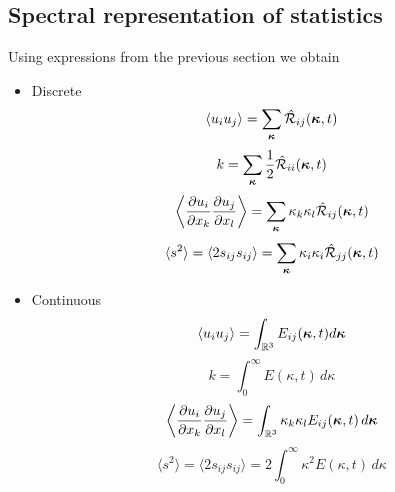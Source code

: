 \documentclass[oneside,a4paper,11pt]{report}
\newcommand{\tpvc}{\mathcal{R}} %
\newcommand{\est}{E}            %
\newcommand{\uifluc}{u_i}
\newcommand{\ujfluc}{u_j}
\begin{document}
\subsection{Spectral representation of statistics}
Using expressions from the previous section we obtain
\begin{itemize}
\item Discrete
\begin{equation}
    \langle \uifluc \ujfluc \rangle = \sum_{\kvec} \hat{\tpvc}_{ij}(\kvec,t)
\end{equation} 
\begin{equation}
    \label{eq:discrete_k_spectral}
    k = \sum_{\kvec} \frac{1}{2} \hat{\tpvc}_{ii}(\kvec,t) 
\end{equation}
\begin{equation}
    \left < \frac{ \partial \uifluc }{ \partial x_k} \frac{ \partial \ujfluc }{ \partial x_l } \right > = \sum_{\kvec} \kappa_k \kappa_l \hat{\tpvc}_{ij}(\kvec,t)
\end{equation}
\begin{equation}
    \langle s^2 \rangle = \langle 2 s_{ij} s_{ij} \rangle = \sum_{\kvec} \kappa_i \kappa_i \hat{\tpvc}_{jj}(\kvec,t)
\end{equation}

\item Continuous
\begin{equation}
    \label{eq:continuous_uiuj_spectral}
    \langle \uifluc \ujfluc \rangle = \int_\Rthree E_{ij}(\kvec,t) d\kvec
\end{equation} 
\begin{equation}
    k =\int_0^\infty \est(\kappa,t) \, d\kappa
\end{equation}
\begin{equation}
    \left < \frac{ \partial \uifluc }{ \partial x_k} \frac{ \partial \ujfluc }{ \partial x_l } \right > = \int_{\Rthree} \kappa_k \kappa_l \est_{ij}(\kvec,t) \, d\kvec
\end{equation}
\begin{equation}
    \label{eq:strain_mag_spectral}
    \langle s^2 \rangle = \langle 2 s_{ij} s_{ij} \rangle = 2 \int_{0}^\infty \kappa^2 \est(\kappa,t) \, d\kappa
\end{equation}
\end{itemize}



\end{document}
